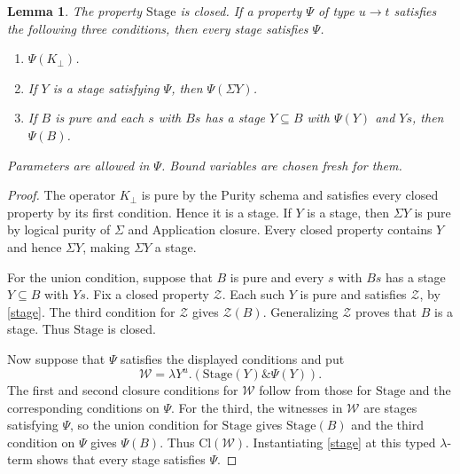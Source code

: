 \documentclass[12pt,leqno]{article}
\newcommand{\AND}{\ensuremath{\mathbin{\&}}}
\newcommand{\Stage}{\mathrm{Stage}}
\newcommand{\Clos}{\mathrm{Cl}}
\newcommand{\cZ}{\mathcal Z}
\newcommand{\Kbot}{K_{\bot}}
\newtheorem{lemma}{Lemma}
\begin{document}
\begin{lemma}\label{induct}
The property $\Stage$ is closed. If a property $\Psi$ of type $u\to t$
satisfies the following three conditions, then every stage satisfies $\Psi$.
\begin{enumerate}
\item $\Psi(\Kbot)$.
\item If $Y$ is a stage satisfying $\Psi$, then $\Psi(\Sigma Y)$.
\item If $B$ is pure and each $s$ with $Bs$ has a stage $Y\subseteq B$
with $\Psi(Y)$ and $Ys$, then $\Psi(B)$.
\end{enumerate}
Parameters are allowed in $\Psi$. Bound variables are chosen fresh for them.
\end{lemma}
\begin{proof}
The operator $\Kbot$ is pure by the Purity schema and satisfies every
closed property by its first condition. Hence it is a stage.
If $Y$ is a stage, then $\Sigma Y$ is pure by logical purity of
$\Sigma$ and Application closure. Every closed property contains $Y$
and hence $\Sigma Y$, making $\Sigma Y$ a stage.

For the union condition, suppose that $B$ is pure and every $s$ with
$Bs$ has a stage $Y\subseteq B$ with $Ys$. Fix a closed property
$\cZ$. Each such $Y$ is pure and satisfies $\cZ$, by
\eqref{stage}. The third condition for $\cZ$ gives $\cZ(B)$.
Generalizing $\cZ$ proves that $B$ is a stage. Thus $\Stage$ is closed.

Now suppose that $\Psi$ satisfies the displayed conditions and put
\[
 \mathcal W=\lambda Y^u.(\Stage(Y)\AND\Psi(Y)).
\]
The first and second closure conditions for $\mathcal W$ follow from
those for $\Stage$ and the corresponding conditions on $\Psi$.
For the third, the witnesses in $\mathcal W$ are stages satisfying
$\Psi$, so the union condition for $\Stage$ gives $\Stage(B)$
and the third condition on $\Psi$ gives $\Psi(B)$.
Thus $\Clos(\mathcal W)$. Instantiating \eqref{stage} at this
typed $\lambda$-term shows that every stage satisfies $\Psi$.
\end{proof}
\end{document}
